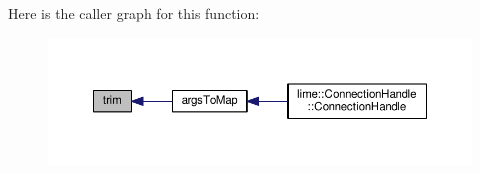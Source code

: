 Here is the caller graph for this function\+:
\nopagebreak
\begin{figure}[H]
\begin{center}
\leavevmode
\includegraphics[width=350pt]{d0/d17/ConnectionHandle_8cpp_a8c7f671a4eaae43db4839df0abcb514a_icgraph}
\end{center}
\end{figure}


